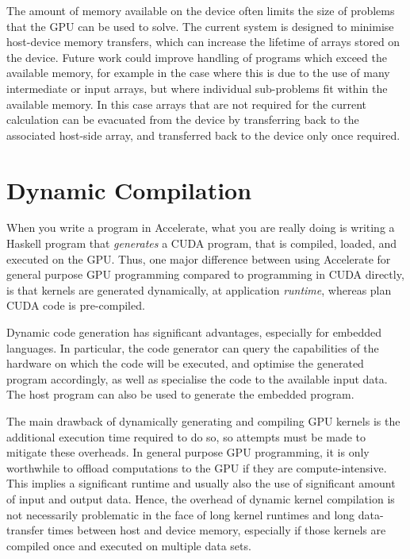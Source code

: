 The amount of memory available on the device often limits the size of problems
that the GPU can be used to solve. The current system is designed to minimise
host-device memory transfers, which can increase the lifetime of arrays stored
on the device. Future work could improve handling of programs which exceed the
available memory, for example in the case where this is due to the use of many
intermediate or input arrays, but where individual sub-problems fit within the
available memory. In this case arrays that are not required for the current
calculation can be evacuated from the device by transferring back to the
associated host-side array, and transferred back to the device only once
required.


\section{Dynamic Compilation}
\label{sec:dynamic_compilation}

When you write a program in Accelerate, what you are really doing is writing a
Haskell program that \emph{generates} a CUDA program, that is compiled, loaded,
and executed on the GPU\@. Thus, one major difference between using Accelerate
for general purpose GPU programming compared to programming in CUDA directly, is
that kernels are generated dynamically, at application \emph{runtime}, whereas
plan CUDA code is pre-compiled.

Dynamic code generation has significant advantages, especially for embedded
languages. In particular, the code generator can query the capabilities of the
hardware on which the code will be executed, and optimise the generated program
accordingly, as well as specialise the code to the available input data. The
host program can also be used to generate the embedded program.

The main drawback of dynamically generating and compiling GPU kernels is the
additional execution time required to do so, so attempts must be made to
mitigate these overheads. In general purpose GPU programming, it is only
worthwhile to offload computations to the GPU if they are compute-intensive.
This implies a significant runtime and usually also the use of significant
amount of input and output data. Hence, the overhead of dynamic kernel
compilation is not necessarily problematic in the face of long kernel runtimes
and long data-transfer times between host and device memory, especially if those
kernels are compiled once and executed on multiple data sets.


